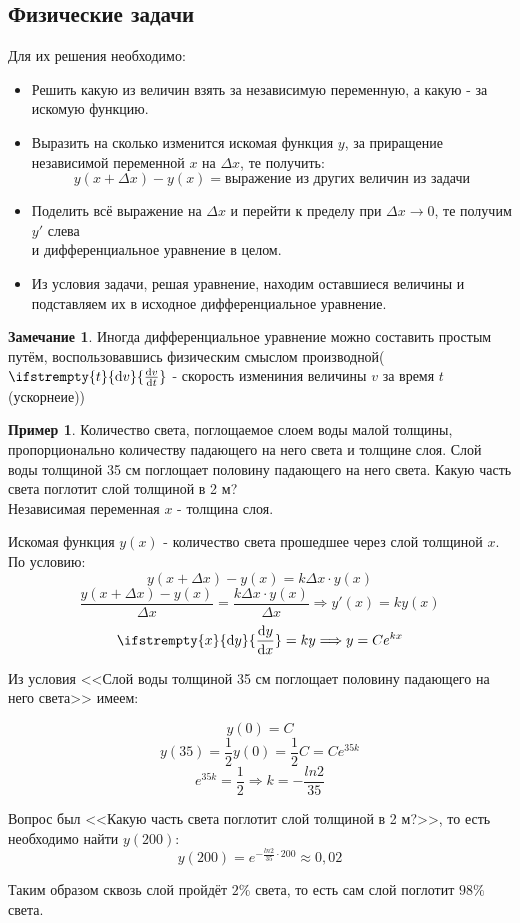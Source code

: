 \documentclass[a4paper, 14pt]{article}
\newcommand{\dv}[2]{%
  \ifstrempty{#2}%
    {\mathrm{d}#1}%
    {\frac{\mathrm{d}#1}{\mathrm{d}#2}}%
}
\theoremstyle{definition}
\newtheorem*{remark}{Замечание}
\newtheorem*{example}{Пример}
\begin{document}
\subsection{Физические задачи}
Для их решения необходимо:
\begin{itemize}
\item \textbf{}Решить какую из величин взять за независимую переменную, а какую - за искомую функцию.
\item \textbf{}Выразить на сколько изменится искомая функция $y$, за приращение независимой переменной $x$ на $\Delta{x}$, те получить:
\[y(x+\Delta{x})-y(x) = \text{выражение из других величин из задачи}\]
\item \textbf{}Поделить всё выражение на $\Delta{x}$ и перейти к пределу при $\Delta{x}\rightarrow0$, те получим $y'$ слева\\ и дифференциальное уравнение в целом.
\item \textbf{}Из условия задачи, решая уравнение, находим оставшиеся величины и подставляем их в исходное дифференциальное уравнение.
\end{itemize}
\begin{remark}
    Иногда дифференциальное уравнение можно составить простым путём, воспользовавшись физическим смыслом производной($\dv{v}{t}$ - скорость измениния величины $v$ за время $t$(ускорнеие))
\end{remark}
\begin{example}
    Количество света, поглощаемое слоем воды малой толщины, пропорционально количеству падающего на него света и толщине слоя. Слой воды толщиной 35 см поглощает половину падающего на него света. Какую часть света поглотит слой толщиной в 2 м?\\

    Независимая переменная $x$ - толщина слоя.
    
    Искомая функция $y(x)$ - количество света прошедшее через слой толщиной $x$.\\
    
    По условию:
    \[y(x+\Delta{x}) - y(x) = k\Delta{x}\cdot y(x)\]
    \[\frac{y(x+\Delta{x}) - y(x)}{\Delta{x}} = \frac{k\Delta{x}\cdot y(x)}{\Delta{x}} \Longrightarrow y'(x) = ky(x)\]
    \[\dv{y}{x} = ky \Longrightarrow y = Ce^{kx}\]

    Из условия <<Слой воды толщиной 35 см поглощает половину падающего на него света>>  имеем:
    
    \[y(0) = C\]
    \[y(35)= \frac{1}{2}y(0) = \frac{1}{2}C=Ce^{35k}\]
    \[e^{35k} = \frac{1}{2} \Longrightarrow k = -\frac{ln{2}}{35}\]

    Вопрос был <<Какую часть света поглотит слой толщиной в 2 м?>>, то есть необходимо найти $y(200):$
    \[y(200) = e^{-\frac{ln{2}}{35} \cdot 200} \approx  0,02\]

    
    Таким образом сквозь слой пройдёт $2\%$  света, то есть сам слой поглотит $98\%$ света.

    
\end{example}
\end{document}
